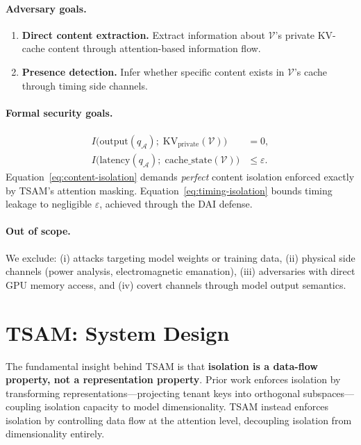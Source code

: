 \documentclass[11pt]{article}
\begin{document}
\paragraph{Adversary goals.}
\begin{enumerate}[leftmargin=*,itemsep=2pt]
    \item \textbf{Direct content extraction.} Extract information about $\mathcal{V}$'s private KV-cache content through attention-based information flow.
    \item \textbf{Presence detection.} Infer whether specific content exists in $\mathcal{V}$'s cache through timing side channels.
\end{enumerate}

\paragraph{Formal security goals.}
\begin{align}
    I\bigl(\mathrm{output}(q_\mathcal{A});\; \mathrm{KV}_{\mathrm{private}}(\mathcal{V})\bigr) &= 0, \label{eq:content-isolation} \\
    I\bigl(\mathrm{latency}(q_\mathcal{A});\; \mathrm{cache\_state}(\mathcal{V})\bigr) &\leq \varepsilon. \label{eq:timing-isolation}
\end{align}
Equation~\eqref{eq:content-isolation} demands \emph{perfect} content isolation enforced exactly by TSAM's attention masking. Equation~\eqref{eq:timing-isolation} bounds timing leakage to negligible $\varepsilon$, achieved through the DAI defense.

\paragraph{Out of scope.}
We exclude: (i) attacks targeting model weights or training data, (ii) physical side channels (power analysis, electromagnetic emanation), (iii) adversaries with direct GPU memory access, and (iv) covert channels through model output semantics.

\section{TSAM: System Design}
\label{sec:design}

The fundamental insight behind TSAM is that \textbf{isolation is a data-flow property, not a representation property}. Prior work enforces isolation by transforming representations---projecting tenant keys into orthogonal subspaces---coupling isolation capacity to model dimensionality. TSAM instead enforces isolation by controlling data flow at the attention level, decoupling isolation from dimensionality entirely.
\end{document}
